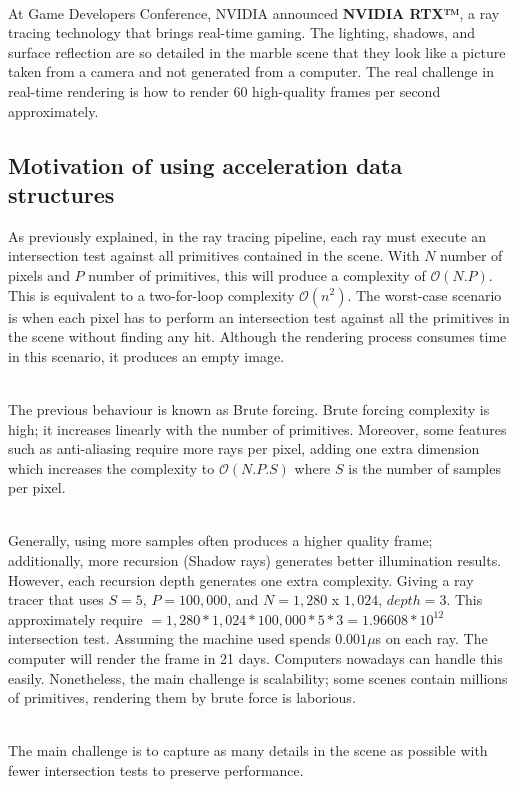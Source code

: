 \documentclass[11pt,a4paper]{article}
\begin{document}
\noindent
\\
At Game Developers Conference, NVIDIA announced \textbf{NVIDIA RTX™}, a ray tracing technology that brings real-time gaming. The lighting, shadows, and surface reflection are so detailed in the marble scene that they look like a picture taken from a camera and not generated from a computer. The real challenge in real-time rendering is how to render 60 high-quality frames per second approximately.


\subsection{Motivation of using acceleration data structures}
As previously explained, in the ray tracing pipeline, each ray must execute an intersection test against all primitives contained in the scene. With $N$ number of pixels and $P$ number of primitives, this will produce a complexity of $\mathcal{O}(N.P)$. This is equivalent to a two-for-loop complexity $\mathcal{O}(n^2)$. The worst-case scenario is when each pixel has to perform an intersection test against all the primitives in the scene without finding any hit. Although the rendering process consumes time in this scenario, it produces an empty image.  

\noindent
\\
The previous behaviour is known as Brute forcing. Brute forcing complexity is high; it increases linearly with the number of primitives. Moreover, some features such as anti-aliasing require more rays per pixel, adding one extra dimension which increases the complexity to  $\mathcal{O}(N.P.S)$ where $S$ is the number of samples per pixel. 

\noindent
\\
Generally, using more samples often produces a higher quality frame; additionally, more recursion (Shadow rays) generates better illumination results. However, each recursion depth generates one extra complexity. Giving a ray tracer that uses $S = 5$, $P = 100, 000$, and $N =  1, 280 $ x $1, 024$, $depth = 3$. This approximately require $= 1, 280 * 1, 024 * 100, 000 * 5 * 3 = 1.96608*10^{12} $ intersection test. Assuming the machine used spends $0.001 \mu$s on each ray. The computer will render the frame in 21 days. Computers nowadays can handle this easily. Nonetheless, the main challenge is scalability; some scenes contain millions of primitives, rendering them by brute force is laborious.  

\noindent
\\ 
The main challenge is to capture as many details in the scene as possible with fewer intersection tests to preserve performance.
\end{document}
